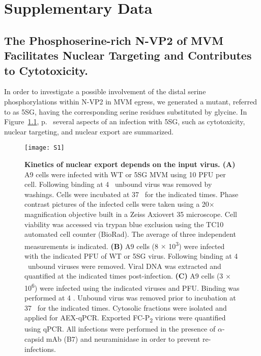 
\chapter{Supplementary Data} %

\label{Results} %


\section{The Phosphoserine-rich N-VP2 of MVM Facilitates Nuclear Targeting and Contributes to Cytotoxicity.}
\label{Cytoskeleton}


\renewcommand{\thefigure}{S\arabic{figure}}
\setcounter{figure}{0}

In order to investigate a possible involvement of the distal serine phosphorylations within N-VP2 in MVM egress, we generated a mutant, referred to as 5SG, having the corresponding serine residues substituted by glycine. In Figure~\ref{S1}, p.~\pageref{S1} several aspects of an infection with 5SG, such as cytotoxicity, nuclear targeting, and nuclear export are summarized.

\begin{figure}
\centering
  \texttt{[image: S1]}
  \caption[Kinetics of nuclear export depends on the input virus.]
   {\textbf{Kinetics of nuclear export depends on the input virus. (A)} A9 cells were infected with WT or 5SG MVM using 10 PFU per cell. Following binding at 4 \textcelsius~unbound virus was removed by washings. Cells were incubated at 37 \textcelsius~for the indicated times. Phase contrast pictures of the infected cells were taken using a 20$\times$ magnification objective built in a Zeiss Axiovert 35 microscope. Cell viability was accessed via trypan blue exclusion using the TC10\textsuperscript{\texttrademark} automated cell counter (BioRad). The average of three independent measurements is indicated. \textbf{(B)} A9 cells (8 $\times$ 10\textsuperscript{3}) were infected with the indicated PFU of WT or 5SG virus. Following binding at 4 \textcelsius~unbound viruses were removed. Viral DNA was extracted and quantified at the indicated times post-infection. \textbf{(C)} A9 cells (3 $\times$ 10\textsuperscript{6}) were infected using the indicated viruses and PFU. Binding was performed at 4 \textcelsius. Unbound virus was removed prior to incubation at 37 \textcelsius~for the indicated times. Cytosolic fractions were isolated and applied for AEX-qPCR. Exported FC-P\textsubscript{2} virions were quantified using qPCR. All infections were performed in the presence of $\alpha$-capsid mAb (B7) and neuraminidase in order to prevent re-infections.} 
\label{S1}
\end{figure}



